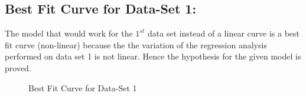 \documentclass[12pt,a4paper]{article}
\begin{document}
\subsection{Best Fit Curve for Data-Set 1:}
The model that would work for the $1^{st}$ data set instead of a linear curve is a best fit curve (non-linear) because the the variation of the regression analysis performed on data set 1 is not linear. Hence the hypothesis for the given model is proved.
\begin{figure}[!ht]
	\begin{center}
	\end{center}
	\caption{Best Fit Curve for Data-Set 1}
\end{figure}
\end{document}
